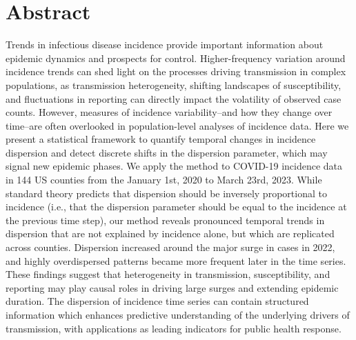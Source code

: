 \documentclass[10pt,letterpaper]{article}
\begin{document}
\section*{Abstract}
Trends in infectious disease incidence provide important information about epidemic dynamics and prospects for control. 
Higher-frequency variation around incidence trends can shed light on the processes driving transmission in complex populations, as transmission heterogeneity, shifting landscapes of susceptibility, and fluctuations in reporting can directly impact the volatility of observed case counts.
However, measures of incidence variability--and how they change over time--are often overlooked in population-level analyses of incidence data.
Here we present a statistical framework to quantify temporal changes in incidence dispersion and detect discrete shifts in the dispersion parameter, which may signal new epidemic phases. 
We apply the method to COVID-19 incidence data in 144 US counties from the January 1st, 2020 to March 23rd, 2023.
While standard theory predicts that dispersion should be inversely proportional to incidence (i.e., that the dispersion parameter should be equal to the incidence at the previous time step), our method reveals pronounced temporal trends in dispersion that are not explained by incidence alone, but which are replicated across counties. 
Dispersion increased around the major surge in cases in 2022, and highly overdispersed patterns became more frequent later in the time series.
These findings suggest that heterogeneity in transmission, susceptibility, and reporting may play causal roles in driving large surges and extending epidemic duration. 
The dispersion of incidence time series can contain structured information which enhances predictive understanding of the underlying drivers of transmission, with applications as leading indicators for public health response.



\end{document}
